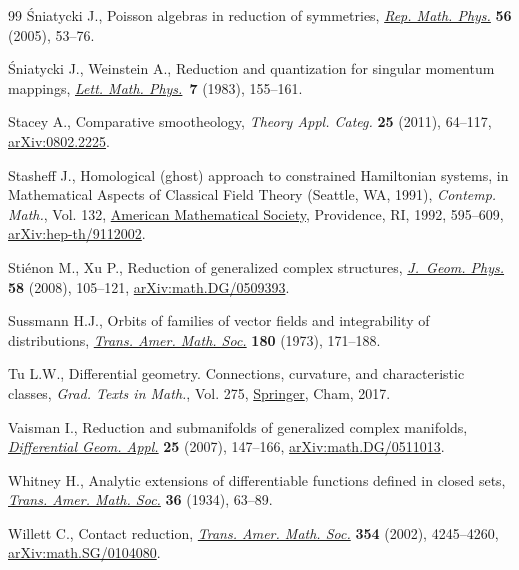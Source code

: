 \documentclass[10pt,a4paper]{amsart}
\numberwithin{equation}{section}
\begin{document}
\begin{thebibliography}{99}
\'Sniatycki J., Poisson algebras in reduction of symmetries, \href{https://doi.org/10.1016/S0034-4877(05)80041-2}{\textit{Rep. Math.
  Phys.}} \textbf{56} (2005), 53--76.

\'Sniatycki J., Weinstein A., Reduction and quantization for singular momentum
  mappings, \href{https://doi.org/10.1007/BF00419934}{\textit{Lett. Math. Phys.}}~\textbf{7} (1983), 155--161.

Stacey A., Comparative smootheology, \textit{Theory Appl. Categ.} \textbf{25}
  (2011), 64--117, \href{https://arxiv.org/abs/0802.2225}{arXiv:0802.2225}.

Stasheff J., Homological (ghost) approach to constrained {H}amiltonian systems,
  in Mathematical Aspects of Classical Field Theory ({S}eattle, {WA}, 1991),
  \textit{Contemp. Math.}, Vol. 132, \href{https://doi.org/10.1090/conm/132/1188459}{American Mathematical Society}, Providence,
  RI, 1992, 595--609, \href{https://arxiv.org/abs/hep-th/9112002}{arXiv:hep-th/9112002}.

Sti\'enon M., Xu P., Reduction of generalized complex structures,
  \href{https://doi.org/10.1016/j.geomphys.2007.09.009}{\textit{J.~Geom. Phys.}} \textbf{58} (2008), 105--121,
  \href{https://arxiv.org/abs/math.DG/0509393}{arXiv:math.DG/0509393}.

Sussmann H.J., Orbits of families of vector fields and integrability of
  distributions, \href{https://doi.org/10.2307/1996660}{\textit{Trans. Amer. Math. Soc.}} \textbf{180} (1973),
  171--188.

Tu L.W., Differential geometry. Connections, curvature, and characteristic
  classes, \textit{Grad. Texts in Math.}, Vol. 275, \href{https://doi.org/10.1007/978-3-319-55084-8}{Springer}, Cham, 2017.

Vaisman I., Reduction and submanifolds of generalized complex manifolds,
  \href{https://doi.org/10.1016/j.difgeo.2006.08.007}{\textit{Differential Geom. Appl.}} \textbf{25} (2007), 147--166,
  \href{https://arxiv.org/abs/math.DG/0511013}{arXiv:math.DG/0511013}.

Whitney H., Analytic extensions of differentiable functions defined in closed
  sets, \href{https://doi.org/10.2307/1989708}{\textit{Trans. Amer. Math. Soc.}} \textbf{36} (1934), 63--89.

Willett C., Contact reduction, \href{https://doi.org/10.1090/S0002-9947-02-03045-3}{\textit{Trans. Amer. Math. Soc.}} \textbf{354}
  (2002), 4245--4260, \href{https://arxiv.org/abs/math.SG/0104080}{arXiv:math.SG/0104080}.

\end{thebibliography}
\end{document}
